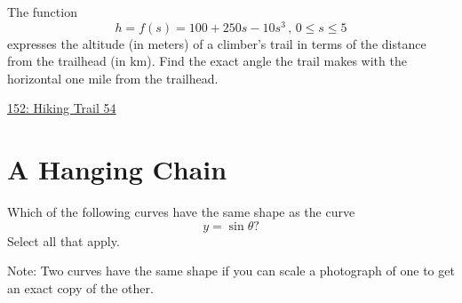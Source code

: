 \documentclass{ximera}
\begin{document}
\begin{question} \label{QOIIdfsdftt444}
The function
\[
 h = f(s) =100+ 250s-10s^3 \, , \, 0\leq s \leq 5
\]
expresses the altitude (in meters) of a climber's trail in terms of the distance from the trailhead (in km). Find the exact angle the trail makes with the horizontal one mile from the trailhead.

\begin{onlineOnly}
    \begin{center}
\end{center}
\end{onlineOnly}

\href{https://www.desmos.com/calculator/ljcugfqmee}{152: Hiking Trail 54}

\end{question}


\section{A Hanging Chain}

\begin{question} \label{QJFefexxxwe}
Which of the following curves have the same shape as the curve
\[
    y = \sin\theta?
\]
Select all that apply.

\begin{selectAll}
\end{selectAll}

Note: Two curves have the same shape if you can scale a photograph of one to get an exact copy of the other.

\end{question}
\end{document}
